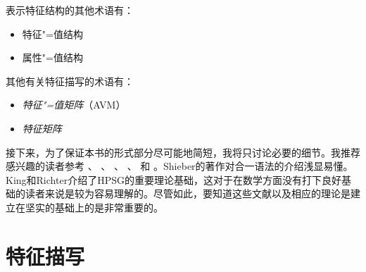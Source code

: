表示特征结构的其他术语有：
\begin{itemize}
\item 特征"=值结构
\item 属性"=值结构
\end{itemize}
其他有关特征描写的术语有：
\begin{itemize}
\item \emph{特征"=值矩阵}（AVM）
\item \emph{特征矩阵}
\end{itemize}
接下来，为了保证本书的形式部分尽可能地简短，我将只讨论必要的细节。我推荐感兴趣的读者参考 \citet{Shieber86a}、 \citet[第2章]{ps}、 \citet{Johnson88}、 \citet{Carpenter92a}、 \citet{King94a}和 \citet{Richter2004a-u}。Shieber的著作对合一语法的介绍浅显易懂。King和Richter介绍了HPSG的重要理论基础，这对于在数学方面没有打下良好基础的读者来说是较为容易理解的。尽管如此，要知道这些文献以及相应的理论是建立在坚实的基础上的是非常重要的。

\section{特征描写}

